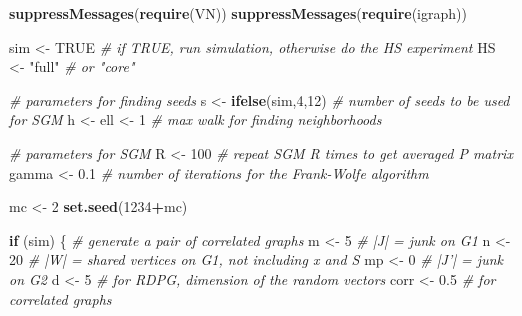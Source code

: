 \documentclass[
]{article}
\newenvironment{Shaded}{\begin{snugshade}}{\end{snugshade}}
\newcommand{\CommentTok}[1]{\textcolor[rgb]{0.56,0.35,0.01}{\textit{#1}}}
\newcommand{\ControlFlowTok}[1]{\textcolor[rgb]{0.13,0.29,0.53}{\textbf{#1}}}
\newcommand{\DecValTok}[1]{\textcolor[rgb]{0.00,0.00,0.81}{#1}}
\newcommand{\FloatTok}[1]{\textcolor[rgb]{0.00,0.00,0.81}{#1}}
\newcommand{\KeywordTok}[1]{\textcolor[rgb]{0.13,0.29,0.53}{\textbf{#1}}}
\newcommand{\NormalTok}[1]{#1}
\newcommand{\OperatorTok}[1]{\textcolor[rgb]{0.81,0.36,0.00}{\textbf{#1}}}
\newcommand{\OtherTok}[1]{\textcolor[rgb]{0.56,0.35,0.01}{#1}}
\newcommand{\StringTok}[1]{\textcolor[rgb]{0.31,0.60,0.02}{#1}}
\begin{document}
\begin{Shaded}
\begin{Highlighting}[]
\KeywordTok{suppressMessages}\NormalTok{(}\KeywordTok{require}\NormalTok{(VN)) }
\KeywordTok{suppressMessages}\NormalTok{(}\KeywordTok{require}\NormalTok{(igraph))}

\NormalTok{sim <-}\StringTok{ }\OtherTok{TRUE} \CommentTok{# if TRUE, run simulation, otherwise do the HS experiment}
\NormalTok{HS <-}\StringTok{ "full"} \CommentTok{# or "core"}

\CommentTok{# parameters for finding seeds}
\NormalTok{s <-}\StringTok{ }\KeywordTok{ifelse}\NormalTok{(sim,}\DecValTok{4}\NormalTok{,}\DecValTok{12}\NormalTok{) }\CommentTok{# number of seeds to be used for SGM}
\NormalTok{h <-}\StringTok{ }\NormalTok{ell <-}\StringTok{ }\DecValTok{1} \CommentTok{# max walk for finding neighborhoods}

\CommentTok{# parameters for SGM}
\NormalTok{R <-}\StringTok{ }\DecValTok{100}     \CommentTok{# repeat SGM R times to get averaged P matrix}
\NormalTok{gamma <-}\StringTok{ }\FloatTok{0.1} \CommentTok{# number of iterations for the Frank-Wolfe algorithm}

\NormalTok{mc <-}\StringTok{ }\DecValTok{2}
\KeywordTok{set.seed}\NormalTok{(}\DecValTok{1234}\OperatorTok{+}\NormalTok{mc)}

\ControlFlowTok{if}\NormalTok{ (sim) \{}
    \CommentTok{# generate a pair of correlated graphs}
\NormalTok{    m <-}\StringTok{ }\DecValTok{5}  \CommentTok{# |J| = junk on G1}
\NormalTok{    n <-}\StringTok{ }\DecValTok{20} \CommentTok{# |W| = shared vertices on G1, not including x and S}
\NormalTok{    mp <-}\StringTok{ }\DecValTok{0} \CommentTok{# |J'| = junk on G2 }
\NormalTok{    d <-}\StringTok{ }\DecValTok{5}  \CommentTok{# for RDPG, dimension of the random vectors}
\NormalTok{    corr <-}\StringTok{ }\FloatTok{0.5} \CommentTok{# for correlated graphs}


\end{Highlighting}
\end{Shaded}
\end{document}
